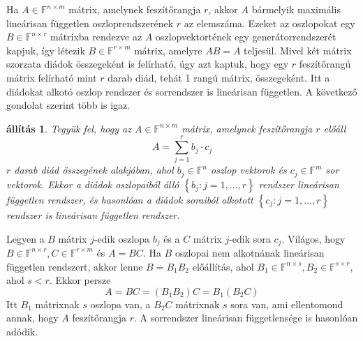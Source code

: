 \documentclass[9pt, showtrims]{memoir}
\makeatletter
\renewenvironment{proof}[1][\proofname]
    {\par\pushQED{\qed}%
    \normalfont \topsep6\p@\@plus6\p@\relax
    \trivlist
    \item[\hskip\labelsep
        \itshape
    #1\@addpunct{:}]\ignorespaces}
    {\popQED\endtrivlist\@endpefalse}
\theoremstyle{plain}
\newtheorem{proposition}{állítás}[section]
\theoremstyle{remark}
\theoremstyle{definition}
\renewcommand{\mathbf}{\mathbb}
\makeatother
\begin{document}
Ha $A\in\mathbf{F}^{n\times m}$ mátrix, amelynek feszítőrangja $r$, 
akkor $A$ bármelyik maximális lineárisan független oszloprendszerének $r$ az elemszáma.
Ezeket az oszlopokat egy $B\in\mathbf{F}^{n\times r}$ mátrixba rendezve az $A$ oszlopvektortének
egy generátorrendszerét kapjuk, 
így létezik $B\in\mathbf{F}^{r\times m}$ mátrix, amelyre $AB=A$ teljesül.
Mivel két mátrix szorzata diádok összegeként is felírható, 
úgy azt kaptuk, hogy egy $r$ feszítőrangú mátrix felírható mint $r$ darab diád,
tehát 1 rangú mátrix, összegeként. 
Itt a diádokat alkotó oszlop rendszer és sorrendszer is lineárisan független.
A következő gondolat szerint több is igaz.
\begin{proposition}
    Tegyük fel, hogy az $A\in\mathbb{F}^{n\times m}$ mátrix, amelynek feszítőrangja $r$ előáll
    \[
    A=\sum_{j=1}^rb_j\cdot c_j
    \]
    $r$ darab diád összegének alakjában, 
    ahol $b_j\in\mathbb{F}^n$ oszlop vektorok és $c_j\in\mathbb{F}^m$ sor vektorok.
    Ekkor a diádok oszlopaiból álló $\left\{ b_j:j=1,\dots,r \right\}$ rendszer lineárisan független rendszer,
    és hasonlóan a diádok soraiból alkotott $\left\{ c_j:j=1,\dots,r \right\}$ rendszer is lineárisan független rendszer.
\end{proposition}
\begin{proof}
    Legyen a $B$ mátrix $j$-edik oszlopa $b_j$ és a $C$ mátrix $j$-edik sora $c_j$.
    Világos, hogy $B\in\mathbb{F}^{n\times r}, C\in\mathbb{F}^{r\times m}$ és 
    $A=BC$.
    Ha $B$ oszlopai nem alkotnának lineárisan független rendszert, akkor 
    lenne $B=B_1B_2$ előállítás, 
    ahol $B_1\in\mathbb{F}^{n\times s}, B_2\in\mathbb{F}^{s\times r}$,
    ahol $s<r$.
    Ekkor persze
    \[
        A=BC=\left( B_1B_2 \right)C=B_1\left( B_2C \right)
    \]
    Itt $B_1$ mátrixnak $s$ oszlopa van, a
    $B_2C$ mátrixnak $s$ sora van,
    ami ellentomond annak, hogy $A$ feszítőrangja $r$.
    A sorrendszer lineárisan függetlensége is hasonlóan adódik.
\end{proof}
\end{document}
